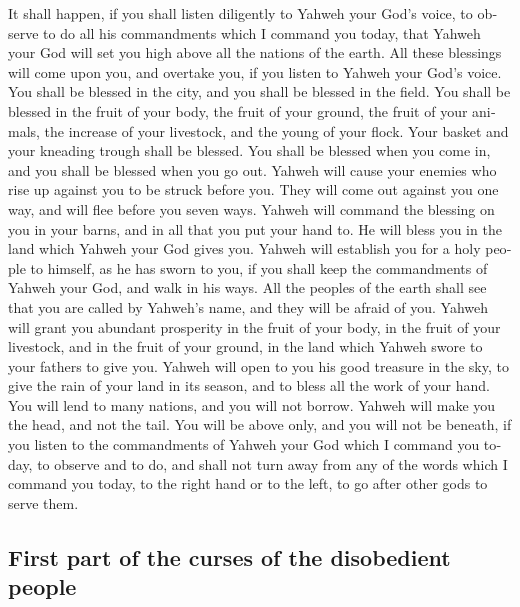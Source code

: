 \begin{paracol}{2}
\begin{otherlanguage}{english}
 It shall happen, if you shall listen diligently to Yahweh
your God's voice, to observe to do all his commandments which I command
you today, that Yahweh your God will set you high above all the nations
of the earth.  All these blessings will come upon you, and
overtake you, if you listen to Yahweh your God's voice. 
You shall be blessed in the city, and you shall be blessed in the field.
 You shall be blessed in the fruit of your body, the fruit
of your ground, the fruit of your animals, the increase of your
livestock, and the young of your flock.  Your basket and
your kneading trough shall be blessed.  You shall be
blessed when you come in, and you shall be blessed when you go out.
 Yahweh will cause your enemies who rise up against you to
be struck before you. They will come out against you one way, and will
flee before you seven ways.  Yahweh will command the
blessing on you in your barns, and in all that you put your hand to. He
will bless you in the land which Yahweh your God gives you.
 Yahweh will establish you for a holy people to himself,
as he has sworn to you, if you shall keep the commandments of Yahweh
your God, and walk in his ways.  All the peoples of the
earth shall see that you are called by Yahweh's name, and they will be
afraid of you.  Yahweh will grant you abundant prosperity
in the fruit of your body, in the fruit of your livestock, and in the
fruit of your ground, in the land which Yahweh swore to your fathers to
give you.  Yahweh will open to you his good treasure in
the sky, to give the rain of your land in its season, and to bless all
the work of your hand. You will lend to many nations, and you will not
borrow.  Yahweh will make you the head, and not the tail.
You will be above only, and you will not be beneath, if you listen to
the commandments of Yahweh your God which I command you today, to
observe and to do,  and shall not turn away from any of
the words which I command you today, to the right hand or to the left,
to go after other gods to serve them.

\hypertarget{first-part-of-the-curses-of-the-disobedient-people}{%
\subsection{First part of the curses of the disobedient
people}\label{first-part-of-the-curses-of-the-disobedient-people}}


\end{otherlanguage}
\end{paracol}

